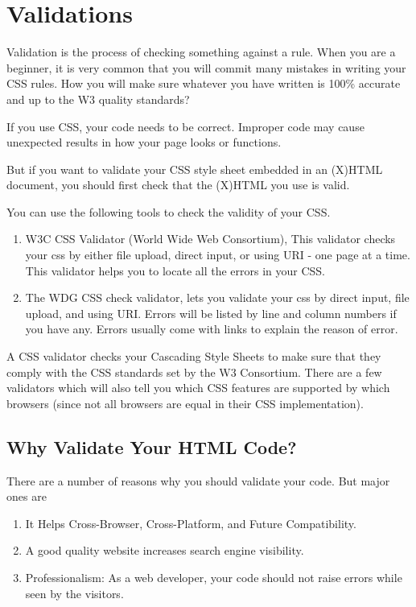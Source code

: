 \documentclass[a4paper,oneside]{book}
\numberwithin{equation}{chapter}
\begin{document}
\section{Validations}
Validation is the process of checking something against a rule. When you are a beginner, it is very common that you will commit many mistakes in writing your CSS rules. How you will make sure whatever you have written is 100\% accurate and up to the W3 quality standards?

If you use CSS, your code needs to be correct. Improper code may cause unexpected results in how your page looks or functions.

But if you want to validate your CSS style sheet embedded in an (X)HTML document, you should first check that the (X)HTML you use is valid.

You can use the following tools to check the validity of your CSS.
\begin{enumerate}
\item W3C CSS Validator (World Wide Web Consortium), This validator checks your css by either file upload, direct input, or using URI - one page at a time. This validator helps you to locate all the errors in your CSS.
\item The WDG CSS check validator, lets you validate your css by direct input, file upload, and using URI. Errors will be listed by line and column numbers if you have any. Errors usually come with links to explain the reason of error. 
\end{enumerate}
A CSS validator checks your Cascading Style Sheets to make sure that they comply with the CSS standards set by the W3 Consortium. There are a few validators which will also tell you which CSS features are supported by which browsers (since not all browsers are equal in their CSS implementation).
\subsection{Why Validate Your HTML Code?}
There are a number of reasons why you should validate your code. But major ones are
\begin{enumerate}
\item It Helps Cross-Browser, Cross-Platform, and Future Compatibility.
\item A good quality website increases search engine visibility.
\item Professionalism: As a web developer, your code should not raise errors while seen by the visitors.
\end{enumerate}
\end{document}
